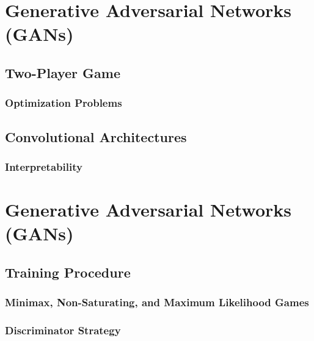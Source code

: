 	\section{Generative Adversarial Networks (GANs)} %

		\subsection{Two-Player Game} %

			\subsubsection{Optimization Problems} %

		\subsection{Convolutional Architectures} %

			\subsubsection{Interpretability} %

	\section{Generative Adversarial Networks (GANs)} %

		\subsection{Training Procedure} %

			\subsubsection{Minimax, Non-Saturating, and Maximum Likelihood Games} %

			\subsubsection{Discriminator Strategy} %


